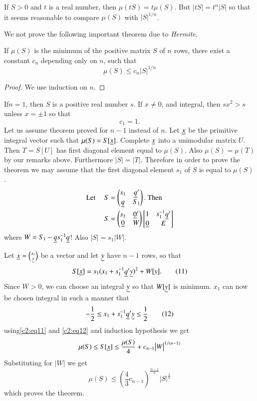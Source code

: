 If $S>0$ and $t$ is a real number, then $\mu(tS)=t\mu(S)$. But
$|tS|=t^{n}|S|$ so that it seems reasonable to compare $\mu(S)$ with
$|S|^{1/n}$.

We not prove the following important theorem due to {\em Hermite}.

\setcounter{thm}{0}
\begin{thm}\label{chap2:thm1}
If $\mu(S)$ is the minimum of the positive matrix $S$ of $n$ rows,
there exist a constant $c_{n}$ depending only on $n$, such that
$$
\mu(S)\leq c_{n}|S|^{1/n}
$$
\end{thm}

\begin{proof}
We use induction on $n$.
\end{proof}

If\pageoriginale $n=1$, then $S$ is a positive real number $s$. If
$x\neq 0$, and integral, then $sx^{2}>s$ unless $x=\pm 1$ so that
$$
c_{1}=1.
$$
Let us assume theorem proved for $n-1$ instead of $n$. Let $\underline{x}$ be
the primitive integral vector such that $\mu(S)=S[\underline{x}]$. Complete
$\underline{x}$ into a unimodular matrix $U$. Then $T=S[U]$ has first
diagonal element equal to $\mu(S)$. Also $\mu(S)=\mu(T)$ by our
remarks above. Furthermore $|S|=|T|$. Therefore in order to prove the
theorem we may assume that the first diagonal element $s_{1}$ of $S$
is equal to $\mu(S)$.
\begin{align*}
\text{Let \quad} S&= 
\begin{pmatrix}
s_{1} & \underline{q}'\\
\underline{q} & S_{1}
\end{pmatrix}
.\text{ Then}\\
S&= 
\begin{pmatrix}
s_{1} & \underline{0}'\\
\underline{0} & W
\end{pmatrix}
\begin{bmatrix}
1 & s^{-1}_{1}\underline{q}'\\
\underline{0} & E
\end{bmatrix}
\end{align*}
where $W=S_{1}-\underline{q}s^{-1}_{1}\underline{q}$! Also $|S|=s_{1}|W|$.

Let $\underline{x}=\binom{x_{1}}{\underline{y}}$ be a vector and let $\underline{y}$ have
$n-1$ rows, so that
\begin{equation*}
S[\underline{x}]=s_{1}(x_{1}+s^{-1}_{1}\underline{q}'\underline{y})^{2}+W[y].\tag{11}\label{c2:eq11}
\end{equation*}
Since $W>0$, we can choose an integral $\underline{y}$ so that $W[\underline{y}]$ is
minimum. $x_{1}$ can now be chosen integral in such a manner that
\begin{equation*}
- \frac{1}{2}\leq x_{1}+s^{-1}_{1}\underline{q}'\underline{y}\leq \frac{1}{2}\tag{12}\label{c2:eq12}
\end{equation*}
using\pageoriginale \eqref{c2:eq11} and \eqref{c2:eq12} and induction hypothesis we get
$$
\mu(S)\leq S[\underline{x}]\leq \frac{\mu(S)}{4}+c_{n-1}\big | W \big|^{1/(n-1)}
$$
Substituting for $|W|$ we get
$$
\mu(S)\leq
\left(\frac{4}{3}c_{n-1}\right)^{\frac{n-1}{n}}|S|^{\frac{1}{n}}
$$
which proves the theorem.

